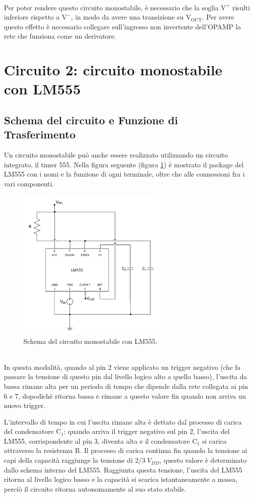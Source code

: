 \documentclass{report}
\begin{document}
\\Per poter rendere questo circuito monostabile, è necessario che la soglia $\mathrm{V^+}$ risulti inferiore rispetto a $\mathrm{V^-}$, in modo da avere una transizione su $\mathrm{V_{OUT}}$. Per avere questo effetto è necessario collegare sull'ingresso non invertente dell'OPAMP la rete che funziona come un derivatore.
\newpage
\section{Circuito 2: circuito monostabile con LM555}
\subsection{Schema del circuito e Funzione di Trasferimento}
Un circuito monostabile può anche essere realizzato utilizzando un circuito integrato, il timer 555. Nella figura seguente (figura \ref{figura:schema2}) è mostrato il package del LM555 con i nomi e la funzione di ogni terminale, oltre che alle connessioni fra i vari componenti.
\begin{figure}[h!]
	\centering
	\includegraphics[height=7.5cm]{immagini/schema2}
	\caption{Schema del circuito monostabile con LM555.}
	\label{figura:schema2}
\end{figure}
\\In questa modalità, quando al pin 2 viene applicato un trigger negativo (che fa passare la tensione di questo pin dal livello logico alto a quello basso), l'uscita da bassa rimane alta per un periodo di tempo che dipende dalla rete collegata ai pin 6 e 7, dopodichè ritorna bassa e rimane a questo valore fin quando non arriva un nuovo trigger.\par
L'intervallo di tempo in cui l'uscita rimane alta è dettato dal processo di carica del condensatore $\mathrm{C_1}$: quando arriva il trigger negativo sul pin 2, l'uscita del LM555, corrispondente al pin 3, diventa alta e il condensatore $\mathrm{C_1}$ si carica attraverso la resistenza $\mathrm{R}$. Il processo di carica continua fin quando la tensione ai capi della capacità raggiunge la tensione di $\displaystyle{2/3\;V_{DD}}$, questo valore è determinato dallo schema interno del LM555. Raggiunta questa tensione, l'uscita del LM555 ritorna al livello logico basso e la capacità si scarica istantaneamente a massa, perciò il circuito ritorna autonomamente al suo stato stabile.
\end{document}
